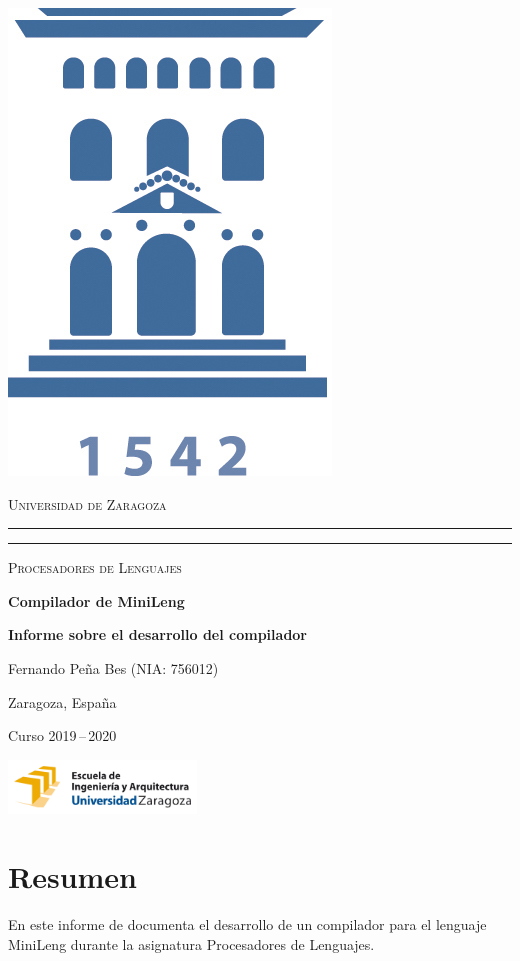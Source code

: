 \documentclass[a4paper,10pt]{article}
\begin{document}
\begin{titlepage}
    \centering
    \includegraphics[width=1 cm]{logoUZ.jpg}

    \textsc{\large Universidad de Zaragoza}
    \rule{\textwidth}{1.6pt}\vspace*{-\baselineskip}\vspace*{2pt} %
    \rule{\textwidth}{0.4pt} %

    \vfill

    {\LARGE \scshape Procesadores de Lenguajes}

    \vspace{2cm}

    {\bfseries \Huge Compilador de MiniLeng}

    \vspace{.5cm}

    {\bfseries \Large Informe sobre el desarrollo del compilador}

    \vspace{3cm}





    {\large Fernando Peña Bes (NIA: 756012)}

    \vfill

    \large{Zaragoza, España}

    {Curso 2019\,--\,2020}

    \vfill

    \includegraphics[width=5.0cm]{EINA.png}

\end{titlepage}



\vspace*{2cm}
\section*{\hfil Resumen \hfil}
En este informe de documenta el desarrollo de un compilador para el lenguaje MiniLeng durante la asignatura Procesadores de Lenguajes.
\end{document}
